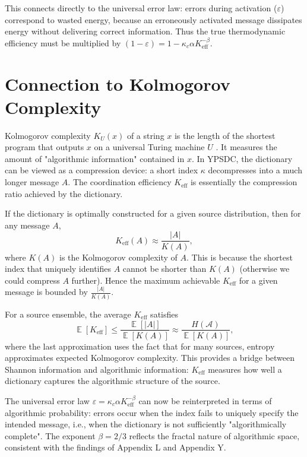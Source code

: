 \documentclass[12pt,a4paper]{article}
\theoremstyle{remark}
\newcommand{\Keff}{K_{\mathrm{eff}}}
\DeclareMathOperator{\E}{\mathbb{E}}
\begin{document}
	This connects directly to the universal error law: errors during activation ($\varepsilon$) correspond to wasted energy, because an erroneously activated message dissipates energy without delivering correct information. Thus the true thermodynamic efficiency must be multiplied by $(1-\varepsilon) = 1 - \kappa_c\alpha K_{\mathrm{eff}}^{-\beta}$.
	
	\section{Connection to Kolmogorov Complexity}
	\label{sec:kolmogorov}
	
	Kolmogorov complexity $K_U(x)$ of a string $x$ is the length of the shortest program that outputs $x$ on a universal Turing machine $U$ \cite{Kolmogorov1965}. It measures the amount of "algorithmic information" contained in $x$. In YPSDC, the dictionary can be viewed as a compression device: a short index $\kappa$ decompresses into a much longer message $A$. The coordination efficiency $\Keff$ is essentially the compression ratio achieved by the dictionary.
	
	If the dictionary is optimally constructed for a given source distribution, then for any message $A$,
	\begin{equation}
		\Keff(A) \approx \frac{|A|}{K(A)}, \label{eq:kolmogorov}
	\end{equation}
	where $K(A)$ is the Kolmogorov complexity of $A$. This is because the shortest index that uniquely identifies $A$ cannot be shorter than $K(A)$ (otherwise we could compress $A$ further). Hence the maximum achievable $\Keff$ for a given message is bounded by $\frac{|A|}{K(A)}$.
	
	For a source ensemble, the average $\Keff$ satisfies
	\begin{equation}
		\E[\Keff] \le \frac{\E[|A|]}{\E[K(A)]} \approx \frac{H(\mathcal{A})}{\E[K(A)]},
	\end{equation}
	where the last approximation uses the fact that for many sources, entropy approximates expected Kolmogorov complexity. This provides a bridge between Shannon information and algorithmic information: $\Keff$ measures how well a dictionary captures the algorithmic structure of the source.
	
	The universal error law $\varepsilon = \kappa_c \alpha K_{\mathrm{eff}}^{-\beta}$ can now be reinterpreted in terms of algorithmic probability: errors occur when the index fails to uniquely specify the intended message, i.e., when the dictionary is not sufficiently "algorithmically complete". The exponent $\beta = 2/3$ reflects the fractal nature of algorithmic space, consistent with the findings of Appendix L and Appendix Y.
	
\end{document}
